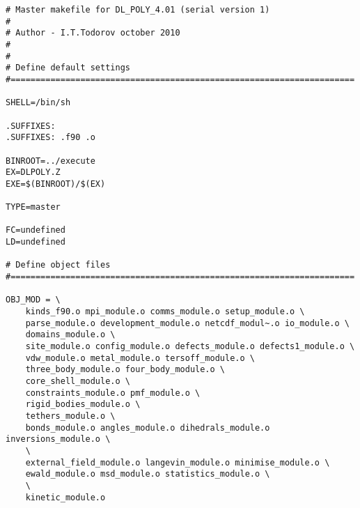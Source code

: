 \begin{verbatim}
# Master makefile for DL_POLY_4.01 (serial version 1)
#
# Author - I.T.Todorov october 2010
#
#
# Define default settings
#=====================================================================

SHELL=/bin/sh

.SUFFIXES:
.SUFFIXES: .f90 .o

BINROOT=../execute
EX=DLPOLY.Z
EXE=$(BINROOT)/$(EX)

TYPE=master

FC=undefined
LD=undefined

# Define object files
#=====================================================================

OBJ_MOD = \
	kinds_f90.o mpi_module.o comms_module.o setup_module.o \
	parse_module.o development_module.o netcdf_modul~.o io_module.o \
	domains_module.o \
	site_module.o config_module.o defects_module.o defects1_module.o \
	vdw_module.o metal_module.o tersoff_module.o \
	three_body_module.o four_body_module.o \
	core_shell_module.o \
	constraints_module.o pmf_module.o \
	rigid_bodies_module.o \
	tethers_module.o \
	bonds_module.o angles_module.o dihedrals_module.o inversions_module.o \
	\
	external_field_module.o langevin_module.o minimise_module.o \
	ewald_module.o msd_module.o statistics_module.o \
	\
	kinetic_module.o


\end{verbatim}
